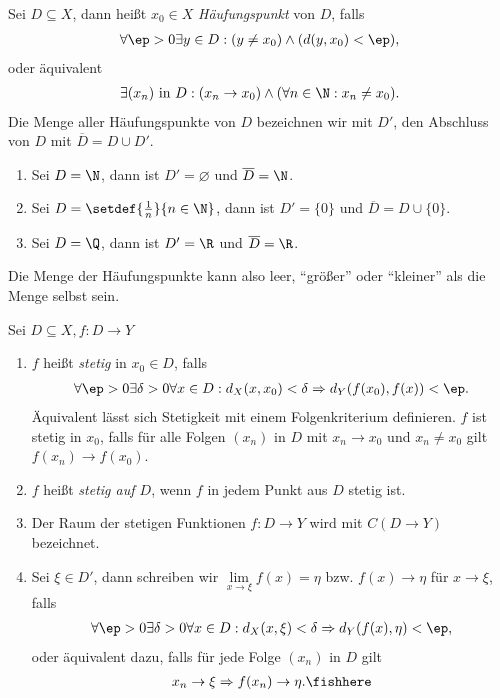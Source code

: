 \begin{defn}
\label{defn:1.18}
Sei $D\subseteq X$, dann heißt $x_0\in X$ \emph{Häufungspunkt} von $D$, falls
\begin{align*}
\forall \ep > 0 \exists y\in D: (y\neq x_0) \land (d(y,x_0)< \ep),
\end{align*}
oder äquivalent
\begin{align*}
\exists (x_n) \text{ in } D : (x_n \to x_0) \land (\forall n\in \N : x_n \neq
x_0).
\end{align*}
Die Menge aller Häufungspunkte von $D$ bezeichnen wir mit $D'$, den Abschluss
von $D$ mit $\overline{D} = D\cup D'$.\fishhere
\end{defn}

\begin{bsp}
\label{bsp:1.19}
\begin{enumerate}
\item Sei $D = \N$, dann ist $D' = \varnothing$ und  $\overline{D} = \N$.
\item Sei $D = \setdef{\frac{1}{n}}{n\in\N}$, dann ist $D' = \{0\}$ und 
$\overline{D} = D\cup\{0\}$.
\item Sei $D = \Q$, dann ist $D' =\R$ und $\overline{D} = \R$.
\end{enumerate}
Die Menge der Häufungspunkte kann also leer, ``größer'' oder ``kleiner'' als die Menge
selbst sein.\bsphere
\end{bsp}

\begin{defn}
\label{defn:1.20}
Sei $D\subseteq X, f: D\to Y$
\begin{enumerate}
  \item $f$ heißt \emph{stetig} in $x_0\in D$, falls
  \begin{align*}
  \forall \ep > 0 \exists \delta > 0 \forall x\in D : d_X(x,x_0) < \delta 
  \Rightarrow d_Y(f(x_0), f(x)) < \ep.
  \end{align*}
  Äquivalent lässt sich Stetigkeit mit einem Folgenkriterium definieren. $f$
  ist stetig in $x_0$, falls für alle Folgen $(x_n)$ in $D$ mit $x_n \to x_0$
  und $x_n\neq x_0$ gilt $f(x_n)\to f(x_0)$.
  \item $f$ heißt \emph{stetig auf $D$}, wenn $f$ in jedem Punkt aus $D$ stetig
  ist.
  \item Der Raum der stetigen Funktionen $f: D\to Y$ wird mit \emph{$C(D\to Y)$}
  bezeichnet.
  \item Sei $\xi\in D'$, dann schreiben wir $\lim\limits_{x\to\xi} f(x) = \eta$
  bzw. $f(x)\to \eta$ für $x\to \xi$, falls
  \begin{align*}
  \forall \ep > 0 \exists \delta > 0 \forall x\in D : d_X(x,\xi) < \delta
  \Rightarrow d_Y(f(x),\eta) < \ep,
  \end{align*}
  oder äquivalent dazu, falls für jede Folge $(x_n)$ in $D$ gilt
  \begin{align*}
  x_n\to\xi \Rightarrow f(x_n)\to\eta.\fishhere
  \end{align*}
\end{enumerate}
\end{defn}

